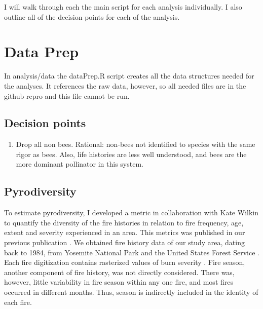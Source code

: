 \documentclass{article}\usepackage[]{graphicx}\usepackage[]{color}
\begin{document}
I will walk through each the main script for each analysis
individually. I also outline all of the decision points for each of
the analysis.



\section{Data Prep}
\label{sec:dataprep}

In analysis/data the dataPrep.R script creates all the data structures
needed for the analyses. It references the raw data, however, so all
needed files are in the github repro and this file cannot be run.

\subsection{Decision points}
\label{sec:dataprep_dp}
\begin{enumerate}
\item Drop all non bees. Rational: non-bees not identified to species
  with the same rigor as bees. Also, life histories are less well
  understood, and bees are the more dominant pollinator in this system.
\end{enumerate}

\subsection{Pyrodiversity}
\label{sec:pyrodiv}

To estimate pyrodiversity, I developed a metric in collaboration with
Kate Wilkin to quantify the diversity of the fire histories in
relation to fire frequency, age, extent and severity experienced in an
area. This metrics was published in our previous publication
\citep{ponisio2016pyrodiversity}. We obtained fire history data of our
study area, dating back to 1984, from Yosemite National Park and the
United States Forest Service \citep{van2012factors,
miller2012Yosemite, yose2012Yosemite}.  Each fire digitization
contains rasterized values of burn severity
\citep{miller2007quantifying}.  Fire season, another component of fire
history, was not directly considered.  There was, however, little
variability in fire season within any one fire, and most fires
occurred in different months.  Thus, season is indirectly included in
the identity of each fire.
\end{document}
